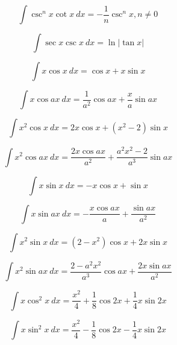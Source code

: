 \begin{equation*}
\int \csc^nx \cot x\ dx = -\frac{1}{n}\csc^n x, n\ne 0
\end{equation*}

\begin{equation*}
\int \sec x \csc x \ dx = \ln | \tan x | 
\end{equation*}

\begin{equation*}
\int x \cos x \ dx = \cos x + x \sin x 
\end{equation*}

\begin{equation*}
\int x \cos ax \ dx = \frac{1}{a^2} \cos ax + \frac{x}{a} \sin ax 
\end{equation*}

\begin{equation*}
\int x^2 \cos x \ dx = 2 x \cos x + \left ( x^2 - 2 \right ) \sin x 
\end{equation*}

\begin{equation*}
\int x^2 \cos ax \ dx = \frac{2 x \cos ax }{a^2} + \frac{ a^2 x^2 - 2  }{a^3} \sin ax 
\end{equation*}

\begin{equation*}
\int x \sin x\ dx = -x \cos x + \sin x 
\end{equation*}

\begin{equation*}
\int x \sin ax\ dx = -\frac{x \cos ax}{a} + \frac{\sin ax}{a^2} 
\end{equation*}

\begin{equation*}
\int x^2 \sin x\ dx = \left(2-x^2\right) \cos x + 2 x \sin x
\end{equation*}

\begin{equation*}
\int x^2 \sin ax\ dx =\frac{2-a^2x^2}{a^3}\cos ax +\frac{ 2 x \sin ax}{a^2} 
\end{equation*}

\begin{equation*}
\int x \cos^2 x \ dx = \frac{x^2}{4}+\frac{1}{8}\cos 2x + \frac{1}{4} x \sin 2x
\end{equation*}

\begin{equation*}
\int x \sin^2 x \ dx = \frac{x^2}{4}-\frac{1}{8}\cos 2x - \frac{1}{4} x \sin 2x
\end{equation*}